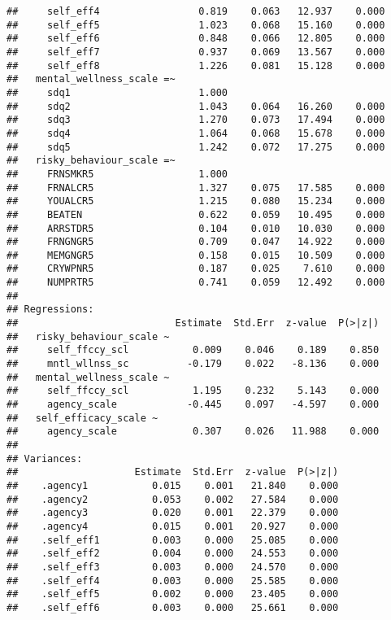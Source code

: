 \documentclass[9pt,]{article}
\begin{document}
\begin{verbatim}
##     self_eff4                 0.819    0.063   12.937    0.000
##     self_eff5                 1.023    0.068   15.160    0.000
##     self_eff6                 0.848    0.066   12.805    0.000
##     self_eff7                 0.937    0.069   13.567    0.000
##     self_eff8                 1.226    0.081   15.128    0.000
##   mental_wellness_scale =~                                    
##     sdq1                      1.000                           
##     sdq2                      1.043    0.064   16.260    0.000
##     sdq3                      1.270    0.073   17.494    0.000
##     sdq4                      1.064    0.068   15.678    0.000
##     sdq5                      1.242    0.072   17.275    0.000
##   risky_behaviour_scale =~                                    
##     FRNSMKR5                  1.000                           
##     FRNALCR5                  1.327    0.075   17.585    0.000
##     YOUALCR5                  1.215    0.080   15.234    0.000
##     BEATEN                    0.622    0.059   10.495    0.000
##     ARRSTDR5                  0.104    0.010   10.030    0.000
##     FRNGNGR5                  0.709    0.047   14.922    0.000
##     MEMGNGR5                  0.158    0.015   10.509    0.000
##     CRYWPNR5                  0.187    0.025    7.610    0.000
##     NUMPRTR5                  0.741    0.059   12.492    0.000
## 
## Regressions:
##                           Estimate  Std.Err  z-value  P(>|z|)
##   risky_behaviour_scale ~                                    
##     self_ffccy_scl           0.009    0.046    0.189    0.850
##     mntl_wllnss_sc          -0.179    0.022   -8.136    0.000
##   mental_wellness_scale ~                                    
##     self_ffccy_scl           1.195    0.232    5.143    0.000
##     agency_scale            -0.445    0.097   -4.597    0.000
##   self_efficacy_scale ~                                      
##     agency_scale             0.307    0.026   11.988    0.000
## 
## Variances:
##                    Estimate  Std.Err  z-value  P(>|z|)
##    .agency1           0.015    0.001   21.840    0.000
##    .agency2           0.053    0.002   27.584    0.000
##    .agency3           0.020    0.001   22.379    0.000
##    .agency4           0.015    0.001   20.927    0.000
##    .self_eff1         0.003    0.000   25.085    0.000
##    .self_eff2         0.004    0.000   24.553    0.000
##    .self_eff3         0.003    0.000   24.570    0.000
##    .self_eff4         0.003    0.000   25.585    0.000
##    .self_eff5         0.002    0.000   23.405    0.000
##    .self_eff6         0.003    0.000   25.661    0.000

\end{verbatim}
\end{document}

